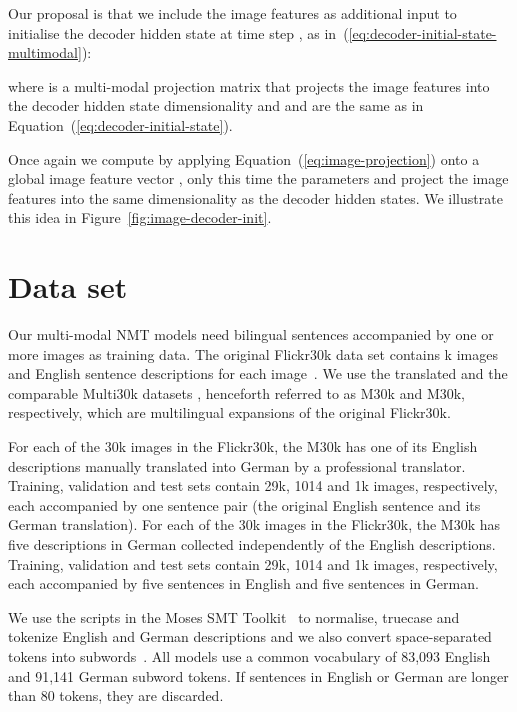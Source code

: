 \documentclass[11pt,twocolumn]{article}
\begin{document}
Our proposal is that we include the image features as additional input to initialise the decoder hidden state at time step , as in~(\ref{eq:decoder-initial-state-multimodal}):

\noindent
where  is a multi-modal projection matrix that projects the image features  into the decoder hidden state dimensionality and  and  are the same as in Equation~(\ref{eq:decoder-initial-state}).

Once again we compute  by applying Equation~(\ref{eq:image-projection}) onto a global image feature vector \mbox{},
only this time the parameters  and  project the image features into the same dimensionality as the decoder hidden states.
We illustrate this idea in Figure~\ref{fig:image-decoder-init}.


\section{Data set}
\label{sec:dataset}

Our multi-modal NMT models need bilingual sentences accompanied by one or more images as training data.
The original Flickr30k data set contains k images and  English sentence descriptions for each image~\cite{Youngetal2014}.
We use the translated and the comparable Multi30k datasets \cite{ElliottFrankSimaanSpecia2016}, henceforth referred to as M30k and M30k, respectively, which are multilingual expansions of the original Flickr30k.

For each of the 30k images in the Flickr30k, the M30k has one of its English descriptions manually translated into German by a professional translator. Training, validation and test sets contain 29k, 1014 and 1k images, respectively, each accompanied by one sentence pair (the original English sentence and its German translation).
For each of the 30k images in the Flickr30k, the M30k has five descriptions in German collected independently of the English descriptions. Training, validation and test sets contain 29k, 1014 and 1k images, respectively, each accompanied by five sentences in English and five sentences in German.

We use the scripts in the Moses SMT Toolkit~\cite{Koehnetal2007} to normalise, truecase and tokenize English and German descriptions
and we also convert space-separated tokens into subwords~\cite{Sennrichetal2016}.
All models use a common vocabulary of 83,093 English and 91,141 German subword tokens.
If sentences in English or German are longer than 80 tokens, they are discarded.
\end{document}
